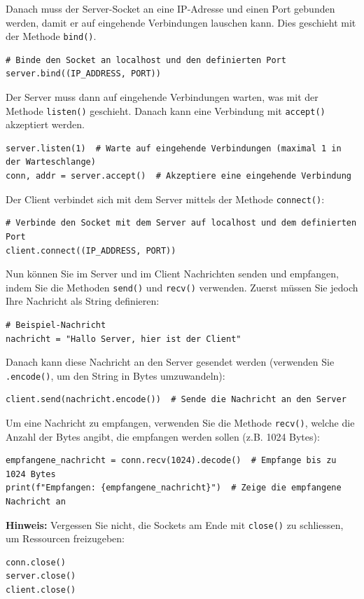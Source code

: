 \begin{myexercise}
    Danach muss der Server-Socket an eine IP-Adresse und einen Port gebunden werden, damit er auf eingehende Verbindungen lauschen kann. Dies geschieht mit der Methode \lstinline|bind()|.
    \begin{lstlisting}
# Binde den Socket an localhost und den definierten Port
server.bind((IP_ADDRESS, PORT))
    \end{lstlisting}

    Der Server muss dann auf eingehende Verbindungen warten, was mit der Methode \lstinline|listen()| geschieht. Danach kann eine Verbindung mit \lstinline|accept()| akzeptiert werden.
    \begin{lstlisting}
server.listen(1)  # Warte auf eingehende Verbindungen (maximal 1 in der Warteschlange)
conn, addr = server.accept()  # Akzeptiere eine eingehende Verbindung
    \end{lstlisting}

    Der Client verbindet sich mit dem Server mittels der Methode \lstinline|connect()|:
    \begin{lstlisting}
# Verbinde den Socket mit dem Server auf localhost und dem definierten Port
client.connect((IP_ADDRESS, PORT))
    \end{lstlisting}
    Nun können Sie im Server und im Client Nachrichten senden und empfangen, indem Sie die Methoden \lstinline|send()| und \lstinline|recv()| verwenden. Zuerst müssen Sie jedoch Ihre Nachricht als String definieren:
    \begin{lstlisting}
# Beispiel-Nachricht
nachricht = "Hallo Server, hier ist der Client"
    \end{lstlisting}
    Danach kann diese Nachricht an den Server gesendet werden (verwenden Sie \texttt{.encode()}, um den String in Bytes umzuwandeln):
    \begin{lstlisting}
client.send(nachricht.encode())  # Sende die Nachricht an den Server
    \end{lstlisting}
    Um eine Nachricht zu empfangen, verwenden Sie die Methode \lstinline|recv()|, welche die Anzahl der Bytes angibt, die empfangen werden sollen (z.B. 1024 Bytes):
    \begin{lstlisting}
empfangene_nachricht = conn.recv(1024).decode()  # Empfange bis zu 1024 Bytes
print(f"Empfangen: {empfangene_nachricht}")  # Zeige die empfangene Nachricht an
    \end{lstlisting}
    \textbf{Hinweis:} Vergessen Sie nicht, die Sockets am Ende mit \lstinline|close()| zu schliessen, um Ressourcen freizugeben:
    \begin{lstlisting}
conn.close()
server.close()
client.close()
     \end{lstlisting}


\end{myexercise}
